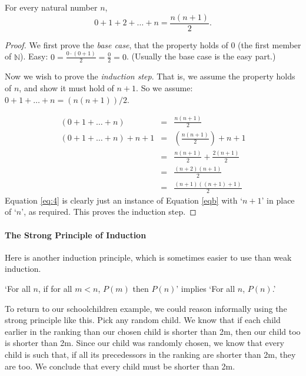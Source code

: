 \begin{theorem} For every natural number $n$, 
\begin{equation}0+1+2+\ldots+n = \frac{n(n+1)}{2}. \label{eqb}
\end{equation}

\begin{proof}
	We first prove the \emph{base case}, that the
	property holds of $0$ (the first member of $\mathbb{N}$). Easy: $0 = \frac{0\cdot(0+1)}{2} = \frac{0}{2} = 0$. (Usually the base case is the easy part.)

	Now we wish to prove the \emph{induction step}. That is, we assume the 
	property holds of $n$, and show it must hold of $n+1$. So we assume:
	$0+1+\ldots+n = (n(n+1))/2$.
  
\begin{eqnarray}
 (0+1+\ldots+n) & = & \frac{n(n+1)}{2}\\
    (0+1+\ldots+n)+n+1 & = & \left(\frac{n(n+1)}{2}\right) + n+1
    \label{eq:1}  \\
      & = & \frac{n(n+1)}{2} + \frac{2(n+1)}{2}
    \label{eq:2}  \\
      & = & \frac{(n+2)(n+1)}{2}
    \label{eq:3}  \\
      & = & \frac{(n+1)((n+1)+1)}{2}
    \label{eq:4}
\end{eqnarray} 
Equation \eqref{eq:4} is clearly just an instance of Equation \eqref{eqb} with `$n+1$' in place of `$n$', as required. This proves the induction step. \end{proof} \end{theorem} 


\paragraph{The Strong Principle of Induction}
Here is another induction principle, which is sometimes easier to use than weak induction.
\begin{definition} `For all $n$, if for all $m<n$, $P(m)$ then $P(n)$' implies `For
   all $n$, $P(n)$.' \end{definition}
To return to our schoolchildren example, we could reason informally using the strong principle like this. Pick any random child. We know that if each child earlier in the ranking than our chosen child is shorter than 2m, then our child too is shorter than 2m. Since our child was randomly chosen, we know that every child is such that, if all its precedessors in the ranking are shorter than 2m, they are too. We conclude that every child must be shorter than 2m.

